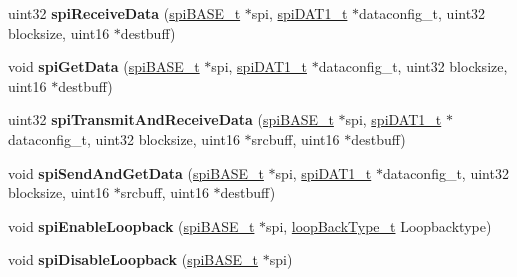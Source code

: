 \begin{DoxyCompactItemize}
\item 
\mbox{\label{group__SPI_gad3d2d61cfbb2bd1369742b6487964f28}} 
uint32 {\bfseries spi\+Receive\+Data} (\mbox{\hyperlink{reg__spi_8h_af46e8a85339f9acf2cc93f22b3a0d1d7}{spi\+B\+A\+S\+E\+\_\+t}} $\ast$spi, \mbox{\hyperlink{structspiDAT1RegConfig}{spi\+D\+A\+T1\+\_\+t}} $\ast$dataconfig\+\_\+t, uint32 blocksize, uint16 $\ast$destbuff)
\item 
\mbox{\label{group__SPI_ga5e86c1106f09ed0de05bd9e4b1fbf8a7}} 
void {\bfseries spi\+Get\+Data} (\mbox{\hyperlink{reg__spi_8h_af46e8a85339f9acf2cc93f22b3a0d1d7}{spi\+B\+A\+S\+E\+\_\+t}} $\ast$spi, \mbox{\hyperlink{structspiDAT1RegConfig}{spi\+D\+A\+T1\+\_\+t}} $\ast$dataconfig\+\_\+t, uint32 blocksize, uint16 $\ast$destbuff)
\item 
\mbox{\label{group__SPI_ga62c1d6f29a139e14df3ed5eae76b5960}} 
uint32 {\bfseries spi\+Transmit\+And\+Receive\+Data} (\mbox{\hyperlink{reg__spi_8h_af46e8a85339f9acf2cc93f22b3a0d1d7}{spi\+B\+A\+S\+E\+\_\+t}} $\ast$spi, \mbox{\hyperlink{structspiDAT1RegConfig}{spi\+D\+A\+T1\+\_\+t}} $\ast$dataconfig\+\_\+t, uint32 blocksize, uint16 $\ast$srcbuff, uint16 $\ast$destbuff)
\item 
\mbox{\label{group__SPI_gab366c629d21d1e7fd3640a39cbfe268e}} 
void {\bfseries spi\+Send\+And\+Get\+Data} (\mbox{\hyperlink{reg__spi_8h_af46e8a85339f9acf2cc93f22b3a0d1d7}{spi\+B\+A\+S\+E\+\_\+t}} $\ast$spi, \mbox{\hyperlink{structspiDAT1RegConfig}{spi\+D\+A\+T1\+\_\+t}} $\ast$dataconfig\+\_\+t, uint32 blocksize, uint16 $\ast$srcbuff, uint16 $\ast$destbuff)
\item 
\mbox{\label{group__SPI_ga5eb26dc370f8056e60c0c7d370712326}} 
void {\bfseries spi\+Enable\+Loopback} (\mbox{\hyperlink{reg__spi_8h_af46e8a85339f9acf2cc93f22b3a0d1d7}{spi\+B\+A\+S\+E\+\_\+t}} $\ast$spi, \mbox{\hyperlink{sys__common_8h_aa61c8f392939c8448c7e3f17a3ecb51c}{loop\+Back\+Type\+\_\+t}} Loopbacktype)
\item 
\mbox{\label{group__SPI_gae97220ee410fa63c32879eb8c1bad043}} 
void {\bfseries spi\+Disable\+Loopback} (\mbox{\hyperlink{reg__spi_8h_af46e8a85339f9acf2cc93f22b3a0d1d7}{spi\+B\+A\+S\+E\+\_\+t}} $\ast$spi)
\item 
\mbox{\label{group__SPI_gab51d614db9846078f904d769bb813cc8}} 

\end{DoxyCompactItemize}
